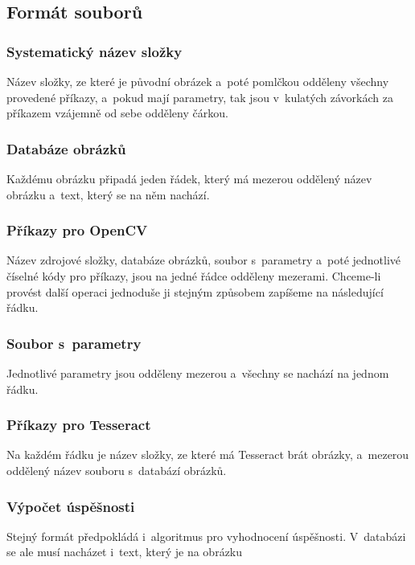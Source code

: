\documentclass[12pt]{report}
\begin{document}
\subsection{Formát souborů}
\subsubsection{Systematický název složky}
Název složky, ze které je původní obrázek a~poté pomlčkou odděleny všechny provedené příkazy, a~pokud mají parametry, tak jsou v~kulatých závorkách za příkazem vzájemně od sebe odděleny čárkou.
\subsubsection{Databáze obrázků}
Každému obrázku připadá jeden řádek, který má mezerou oddělený název obrázku a~text, který se na něm nachází.
\subsubsection{Příkazy pro OpenCV}
Název zdrojové složky, databáze obrázků, soubor s~parametry a~poté jednotlivé číselné kódy pro příkazy, jsou na jedné řádce odděleny mezerami. Chceme-li provést další operaci jednoduše ji stejným způsobem zapíšeme na následující řádku.
\subsubsection{Soubor s~parametry}
Jednotlivé parametry jsou odděleny mezerou a~všechny se nachází na jednom řádku.
\subsubsection{Příkazy pro Tesseract}
Na každém řádku je název složky, ze které má Tesseract brát obrázky, a~mezerou oddělený název souboru s~databází obrázků.
\subsubsection{Výpočet úspěšnosti}
Stejný formát předpokládá i~algoritmus pro vyhodnocení úspěšnosti. V~databázi se ale musí nacházet i~text, který je na obrázku


 \printbibliography
\end{document}
